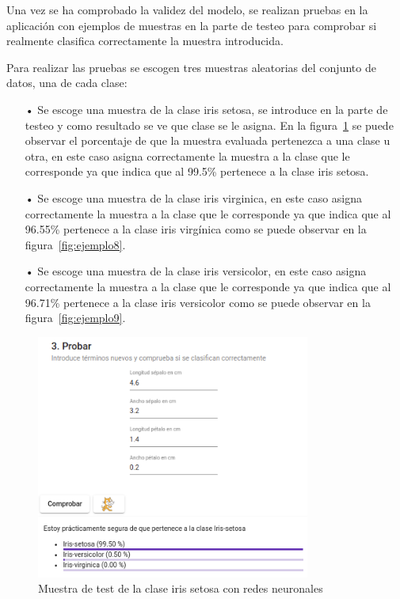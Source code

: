 \documentclass[a4paper, 12pt]{book}
\begin{document}
Una vez se ha comprobado la validez del modelo, se realizan pruebas en la aplicación con ejemplos de muestras en la parte de testeo para comprobar si realmente clasifica correctamente la muestra introducida. 

Para realizar las pruebas se escogen tres muestras aleatorias del conjunto de datos, una de cada clase:
\begin{itemize}
\item[•] Se escoge una muestra de la clase iris setosa, se introduce en la parte de testeo y como resultado se ve que clase se le asigna. En la figura~\ref{fig:ejemplo7} se puede observar el porcentaje de que la muestra evaluada pertenezca a una clase u otra, en este caso asigna correctamente la muestra a la clase que le corresponde ya que indica que al 99.5\% pertenece a la clase iris setosa. 
\item[•] Se escoge una muestra de la clase iris virginica, en este caso asigna correctamente la muestra a la clase que le corresponde ya que indica que al 96.55\% pertenece a la clase iris virgínica como se puede observar en la figura~\ref{fig:ejemplo8}.
\item[•] Se escoge una muestra de la clase iris versicolor, en este caso asigna correctamente la muestra a la clase que le corresponde ya que indica que al 96.71\% pertenece a la clase iris versicolor como se puede observar en la figura~\ref{fig:ejemplo9}.
\end{itemize}

\begin{figure}
	\centering
	\includegraphics[width=9cm, keepaspectratio]{img/iris_set_num_rn.png}
	\caption{Muestra de test de la clase iris setosa con redes neuronales} 	\label{fig:ejemplo7}
\end{figure}
\end{document}
